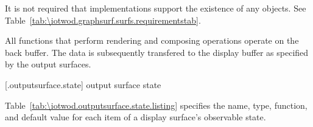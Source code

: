 \pnum
It is not required that implementations support the existence of any  objects. See Table~\ref{tab:\iotwod.graphsurf.surfs.requirementstab}.

\pnum
All functions that perform rendering and composing operations operate on the back buffer. The data is subsequently transfered to the display buffer as specified by the output surfaces.%

 [\iotwod.outputsurface.state] {output surface state}

\pnum
Table~\ref{tab:\iotwod.outputsurface.state.listing} specifies the name, type, function, and default value for each item of a display surface's observable state.

